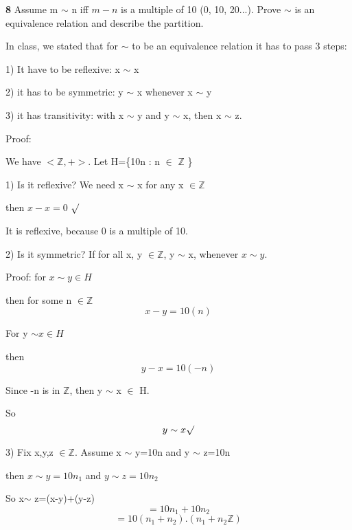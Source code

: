\documentclass{article}
\begin{document}
 
\newpage
\textbf{8} Assume m $\sim$ n iff $m-n$ is a multiple of 10 (0, 10, 20...). Prove $\sim$ is an equivalence relation and describe the partition.



In class, we stated that for $\sim$ to be an equivalence relation it has to pass 3 steps:

\medskip

1) It have to be reflexive: x $\sim$ x


\medskip

2) it has to be symmetric: y $\sim$ x whenever x $\sim$  y



\medskip

3) it has transitivity: with x $\sim$  y and y $\sim$ x, then x $\sim$ z.

\medskip

Proof:
\medskip

We have $ <\mathbb{Z}, +>$. Let H=\{10n : n $\in$ $\mathbb{Z}$ \}

\medskip


1) Is it reflexive?  We need x $\sim$ x for any x $\in \mathbb{Z}$

then $x-x=0$ $\surd$

It is reflexive, because 0 is a multiple of 10.


\bigskip

2) Is it symmetric? If for all  x, y $\in \mathbb{Z}$, y $\sim$ x, whenever $x \sim y$.
\medskip


Proof: for $x \sim y \in H$

\medskip

then for some n $\in \mathbb{Z}$  $$x-y=10(n)$$

For y $\sim x \in H$

then $$y-x=10(-n)$$



Since -n is in $\mathbb{Z}$, then y $\sim$ x $\in$ H.
\medskip

So $$y \sim x \surd$$

\medskip

3) Fix x,y,z $\in \mathbb{Z}$.  Assume  x $\sim$ y=10n and y $\sim$ z=10n

\medskip

then   $x \sim y=10n_{1}$ and $y \sim z=10n_{2}$

So x$\sim$ z=(x-y)+(y-z)
$$=10n_{1}+10n_{2}$$
$$=10(n_{1}+n_{2}). (n_{1}+n_{2}\mathbb{Z})$$
\end{document}
